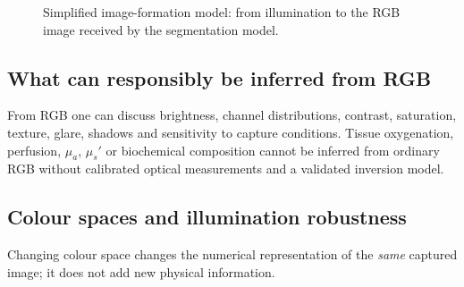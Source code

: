 \documentclass[12pt,a4paper]{article}
\begin{document}
\begin{figure}[H]\centering
{}
\caption{Simplified image-formation model: from illumination to the RGB image received by the segmentation model.}\label{fig:optics}
\end{figure}

\subsection{What can responsibly be inferred from RGB}
From RGB one can discuss brightness, channel distributions, contrast, saturation, texture, glare, shadows and sensitivity to capture conditions. Tissue oxygenation, perfusion, $\mu_a$, $\mu_s'$ or biochemical composition cannot be inferred from ordinary RGB without calibrated optical measurements and a validated inversion model.

\subsection{Colour spaces and illumination robustness}
Changing colour space changes the numerical representation of the \emph{same} captured image; it does not add new physical information.
\end{document}
